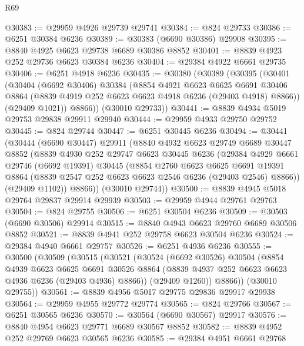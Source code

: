\begin{lexlean}{R69}
\begin{coremodule}
{@30383 := @29959 @4926 @29739 @29741
@30384 := @824 @29733
@30386 := @6251 @30384 @6236
@30389 := @30383 (@6690 @30386) @29908
@30395 := @8840 @4925 @6623 @29738 @6689 @30386 @8852
@30401 := @8839 @4923 @252 @29736 @6623 @30384 @6236
@30404 := @29384 @4922 @6661 @29735
@30406 := @6251 @4918 @6236
@30435 := @30380
    (@30389
      (@30395
        (@30401
          (@30404
            (@6692 @30406)
            @30384
            (@8854
              @4921
              @6623
              @6625
              @6691
              @30406
              @8864
              (@8839 @4919 @252 @6623 @6623 @4918 @6236 (@29403 @4918) @8866))
            (@29409 @1021))
          @8866))
      (@30010 @29733))
@30441 := @8839 @4934 @5019 @29753 @29838 @29911 @29940
@30444 := @29959 @4933 @29750 @29752
@30445 := @824 @29744
@30447 := @6251 @30445 @6236
@30494 := @30441
    (@30444
      (@6690 @30447)
      @29911
      (@8840
        @4932
        @6623
        @29749
        @6689
        @30447
        @8852
        (@8839
          @4930
          @252
          @29747
          @6623
          @30445
          @6236
          (@29384
            @4929
            @6661
            @29746
            (@6692 @19391)
            @30445
            (@8854
              @2760
              @6623
              @6625
              @6691
              @19391
              @8864
              (@8839 @2547 @252 @6623 @6623 @2546 @6236 (@29403 @2546) @8866))
            (@29409 @1102))
          @8866))
      (@30010 @29744))
@30500 := @8839 @4945 @5018 @29764 @29837 @29914 @29939
@30503 := @29959 @4944 @29761 @29763
@30504 := @824 @29755
@30506 := @6251 @30504 @6236
@30509 := @30503 (@6690 @30506) @29914
@30515 := @8840 @4943 @6623 @29760 @6689 @30506 @8852
@30521 := @8839 @4941 @252 @29758 @6623 @30504 @6236
@30524 := @29384 @4940 @6661 @29757
@30526 := @6251 @4936 @6236
@30555 := @30500
    (@30509
      (@30515
        (@30521
          (@30524
            (@6692 @30526)
            @30504
            (@8854
              @4939
              @6623
              @6625
              @6691
              @30526
              @8864
              (@8839 @4937 @252 @6623 @6623 @4936 @6236 (@29403 @4936) @8866))
            (@29409 @1260))
          @8866))
      (@30010 @29755))
@30561 := @8839 @4956 @5017 @29775 @29836 @29917 @29938
@30564 := @29959 @4955 @29772 @29774
@30565 := @824 @29766
@30567 := @6251 @30565 @6236
@30570 := @30564 (@6690 @30567) @29917
@30576 := @8840 @4954 @6623 @29771 @6689 @30567 @8852
@30582 := @8839 @4952 @252 @29769 @6623 @30565 @6236
@30585 := @29384 @4951 @6661 @29768
}
\end{coremodule}
\end{lexlean}
